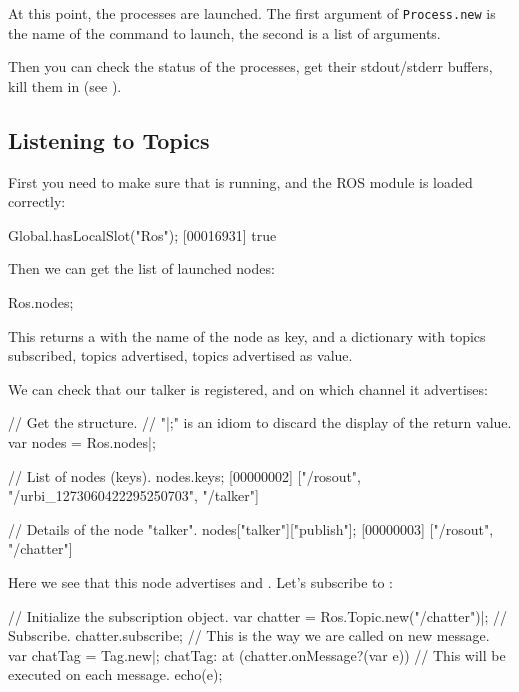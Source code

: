At this point, the processes are launched. The first argument of
\lstinline{Process.new} is the name of the command to launch, the second is
a list of arguments.

Then you can check the status of the processes, get their stdout/stderr
buffers, kill them in \us (see ).


\subsection{Listening to Topics}

First you need to make sure that  is running, and the ROS
module is loaded correctly:

\begin{urbiunchecked}
Global.hasLocalSlot("Ros");
[00016931] true
\end{urbiunchecked}

\noindent
Then we can get the list of launched nodes:

\begin{urbiunchecked}
Ros.nodes;
\end{urbiunchecked}

This returns a  with the name of the node as key, and
a dictionary with topics subscribed, topics advertised, topics advertised as
value.

We can check that our talker is registered, and on which channel it
advertises:

\begin{urbiunchecked}
// Get the structure.
// "|;" is an idiom to discard the display of the return value.
var nodes = Ros.nodes|;

// List of nodes (keys).
nodes.keys;
[00000002] ["/rosout", "/urbi_1273060422295250703", "/talker"]

// Details of the node "talker".
nodes["talker"]["publish"];
[00000003] ["/rosout", "/chatter"]
\end{urbiunchecked}

Here we see that this node advertises  and
. Let's subscribe to :

\begin{urbiunchecked}
// Initialize the subscription object.
var chatter = Ros.Topic.new("/chatter")|;
// Subscribe.
chatter.subscribe;
// This is the way we are called on new message.
var chatTag = Tag.new|;
chatTag: at (chatter.onMessage?(var e))
  // This will be executed on each message.
  echo(e);
\end{urbiunchecked}

